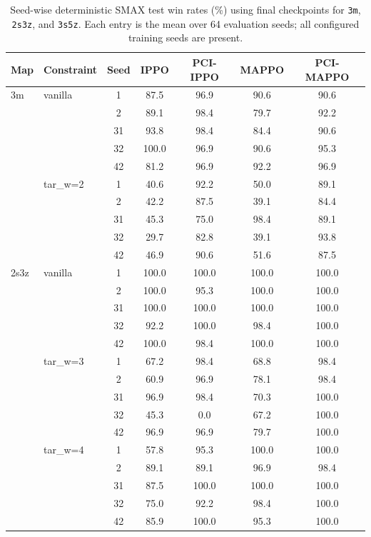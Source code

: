 \begin{table}[t]
\centering
\small
\setlength{\tabcolsep}{4pt}
\caption{Seed-wise deterministic SMAX test win rates (\%) using final checkpoints for \texttt{3m}, \texttt{2s3z}, and \texttt{3s5z}. Each entry is the mean over 64 evaluation seeds; all configured training seeds are present.}
\label{tab:smax_seedwise_part1}
\begin{tabular}{llccccc}
\toprule
Map & Constraint & Seed & IPPO & PCI-IPPO & MAPPO & PCI-MAPPO \\
\midrule
3m & vanilla & 1 & 87.5 & 96.9 & 90.6 & 90.6 \\
 &  & 2 & 89.1 & 98.4 & 79.7 & 92.2 \\
 &  & 31 & 93.8 & 98.4 & 84.4 & 90.6 \\
 &  & 32 & 100.0 & 96.9 & 90.6 & 95.3 \\
 &  & 42 & 81.2 & 96.9 & 92.2 & 96.9 \\
 & tar_w=2 & 1 & 40.6 & 92.2 & 50.0 & 89.1 \\
 &  & 2 & 42.2 & 87.5 & 39.1 & 84.4 \\
 &  & 31 & 45.3 & 75.0 & 98.4 & 89.1 \\
 &  & 32 & 29.7 & 82.8 & 39.1 & 93.8 \\
 &  & 42 & 46.9 & 90.6 & 51.6 & 87.5 \\
\midrule
2s3z & vanilla & 1 & 100.0 & 100.0 & 100.0 & 100.0 \\
 &  & 2 & 100.0 & 95.3 & 100.0 & 100.0 \\
 &  & 31 & 100.0 & 100.0 & 100.0 & 100.0 \\
 &  & 32 & 92.2 & 100.0 & 98.4 & 100.0 \\
 &  & 42 & 100.0 & 98.4 & 100.0 & 100.0 \\
 & tar_w=3 & 1 & 67.2 & 98.4 & 68.8 & 98.4 \\
 &  & 2 & 60.9 & 96.9 & 78.1 & 98.4 \\
 &  & 31 & 96.9 & 98.4 & 70.3 & 100.0 \\
 &  & 32 & 45.3 & 0.0 & 67.2 & 100.0 \\
 &  & 42 & 96.9 & 96.9 & 79.7 & 100.0 \\
 & tar_w=4 & 1 & 57.8 & 95.3 & 100.0 & 100.0 \\
 &  & 2 & 89.1 & 89.1 & 96.9 & 98.4 \\
 &  & 31 & 87.5 & 100.0 & 100.0 & 100.0 \\
 &  & 32 & 75.0 & 92.2 & 98.4 & 100.0 \\
 &  & 42 & 85.9 & 100.0 & 95.3 & 100.0 \\

\end{tabular}
\end{table}
